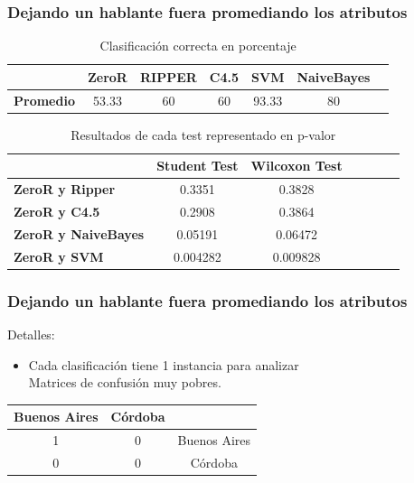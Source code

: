 \documentclass[mathserif]{beamer}%
\begin{document}
\begin{frame}
	\frametitle{Dejando un hablante fuera promediando los atributos}
	\begin{table}[H]
		\centering
		\begin{tabular}{|l|c|c|c|c|c|c|}
			\hline
			\textbf{}  & \textbf{ZeroR} & \textbf{RIPPER} & \textbf{C4.5} & \textbf{SVM} & \textbf{NaiveBayes} \\ \hline
			\textbf{Promedio} & 53.33 & 60 & 60 & 93.33 & 80  \\ \hline
		\end{tabular}
		\caption{Clasificación correcta en porcentaje}
		\label{class_corr_en_pct}
	\end{table}
	

\begin{table}[H]
	\centering
	\begin{tabular}{|l|c|c|c|c|c|c|}
		\hline
		\textbf{}  & \textbf{Student Test} & \textbf{Wilcoxon Test} \\ \hline
		\textbf{ZeroR y Ripper}  & 0.3351 & 0.3828 \\ \hline
		\textbf{ZeroR y C4.5}  & 0.2908 &  0.3864 \\ \hline
		\textbf{ZeroR y NaiveBayes}  & 0.05191 & 0.06472 \\ \hline
		\textbf{ZeroR y SVM}  &  0.004282 & 0.009828 \\ \hline
	\end{tabular}
	\caption{Resultados de cada test representado en p-valor}
	\label{res_tests_wilcoxon_student}
\end{table}
	
\end{frame}

\begin{frame}
	\frametitle{Dejando un hablante fuera promediando los atributos}
	
	Detalles:
	
	\begin{itemize}
		\item Cada clasificación tiene 1 instancia para analizar \\
		Matrices de confusión muy pobres.
	\end{itemize}
	
	\begin{table}[H]
		\centering
		\begin{tabular}{|c|c|c|}
		\hline
		Buenos Aires & Córdoba & \\ \hline
		1 & 0 & Buenos Aires\\ \hline
		0 & 0 & Córdoba\\ \hline
		\end{tabular}
	\end{table}
\end{frame}
\end{document}
